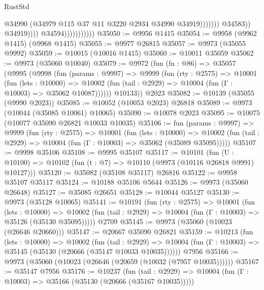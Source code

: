 \begin{lexlean}{RustStd}
\begin{coremodule}
                                                  @34990
                                                  (@34979
                                                    @115
                                                    @37
                                                    @11
                                                    @3220
                                                    @2934
                                                    @34990
                                                    @34919)))))))
                                      @34583))
                                  @34919))))
                          @34594)))))))))))
@35050 := @9956 @1415
@35054 := @9958 (@9962 @1415) (@9968 @1415)
@35055 := @9977 @26815
@35057 := @9973 (@35055 @9992)
@35059 := @10015 (@10016 @1415)
@35060 := @10011 @35059
@35062 := @9973 (@35060 @10040)
@35079 := @9972
    (fun (fn : @86) =>
    @35057
      (@9995
        (@9998
          (fun (params : @9997) =>
          @9999
            (fun (rty : @2575) =>
            @10001
              (fun (lets : @10000) =>
              @10002 (fun (tail : @2929) => @10004 (fun (Γ : @10003) => @35062 @10087))))))
        @10133))
    @2023
@35082 := @10139 (@35055 (@9990 @2023))
@35085 := @10052 (@10053 @2023) @26818
@35089 := @9973 (@10044 (@35085 @10061) @10065)
@35090 := @10078 @2023
@35095 := @10075 (@10077 @35090 @26821 @10033 @10035)
@35106 := fun (params : @9997) =>
  @9999
    (fun (rty : @2575) =>
    @10001
      (fun (lets : @10000) =>
      @10002 (fun (tail : @2929) => @10004 (fun (Γ : @10003) => @35062 (@35089 @35095)))))
@35107 := @9998 @35106
@35108 := @9995 @35107
@35117 := @10101
    (fun (U : @10100) => @10102 (fun (t : @7) => @10110 (@9973 (@10116 @26818 @9991) @10127)))
@35120 := @35082 (@35108 @35117) @26816
@35122 := @9958 @35107 @35117
@35124 := @10188 @35106 @5644
@35126 := @9973 (@35060 @26648)
@35127 := @35085 @26651
@35128 := @10044 @35127
@35130 := @9973 (@35128 @10065)
@35141 := @10191
    (fun (rty : @2575) =>
    @10001
      (fun (lets : @10000) =>
      @10002 (fun (tail : @2929) => @10004 (fun (Γ : @10003) => @35126 (@35130 @35095)))))
    @2709
@35145 := @9973 (@35060 (@10023 (@26646 @20660)))
@35147 := @20667 @35090 @26821
@35159 := @10213
    (fun (lets : @10000) =>
    @10002
      (fun (tail : @2929) =>
      @10004 (fun (Γ : @10003) => @35145 (@35130 (@20666 (@35147 @10033 @10035))))))
    @7956
@35166 := @9973 (@35060 (@10023 (@26646 (@20659 (@10032 (@7957 @10035))))))
@35167 := @35147 @7956
@35176 := @10237
    (fun (tail : @2929) => @10004 (fun (Γ : @10003) => @35166 (@35130 (@20666 (@35167 @10035)))))

\end{coremodule}
\end{lexlean}

